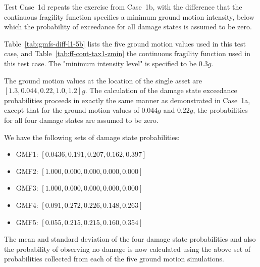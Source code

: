 Test Case~1d repeats the exercise from Case~1b, with the difference that the continuous fragility function specifies a minimum ground motion intensity, below which the probability of exceedance for all damage states is assumed to be zero.

Table~\ref{tab:gmfs-diff-l1-5b} lists the five ground motion values used in this test case, and Table~\ref{tab:ff-cont-tax1-zmin} the continuous fragility function used in this test case. The "minimum intensity level" is specified to be $0.3 g$.

The ground motion values at the location of the single asset are $[1.3, 0.044, 0.22, 1.0, 1.2] g$. The calculation of the damage state exceedance probabilities proceeds in exactly the same manner as demonstrated in Case~1a, except that for the ground motion values of $0.044 g$ and $0.22 g$, the probabilities for all four damage states are assumed to be zero.

We have the following sets of damage state probabilities:

\begin{itemize}
	\item GMF1: $[0.0436, 0.191, 0.207, 0.162, 0.397]$
	\item GMF2: $[1.000, 0.000, 0.000, 0.000, 0.000]$
	\item GMF3: $[1.000, 0.000, 0.000, 0.000, 0.000]$
	\item GMF4: $[0.091, 0.272, 0.226, 0.148, 0.263]$
	\item GMF5: $[0.055, 0.215, 0.215, 0.160, 0.354]$
\end{itemize}

The mean and standard deviation of the four damage state probabilities and also the probability of observing no damage is now calculated using the above set of probabilities collected from each of the five ground motion simulations.
